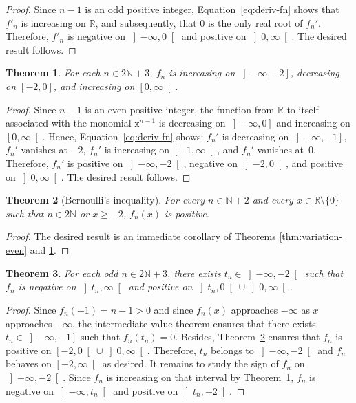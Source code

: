 \documentclass[12pt]{article}
\newcommand{\bR}{\mathbb{R}}
\newcommand{\bN}{\mathbb{N}}
\newcommand{\gtint}[1]{\left] #1, \infty \right[}
\newcommand{\geint}[1]{\left[ #1, \infty \right[}
\newcommand{\ltint}[1]{\left]- \infty, #1 \right[}
\newcommand{\leint}[1]{\left]- \infty, #1 \right]}
\newcommand{\ttx}{\mathtt{x}}
\newtheorem{theorem}{Theorem}
\begin{document}
 \begin{proof}
   Since $n - 1$ is an odd positive integer,
   Equation~\eqref{eq:deriv-fn} shows that
   $f'_n$ is increasing on $\bR$,
   and subsequently, that
   $0$ is the only real root of $f_n'$.
   Therefore,
   $f'_n$ is negative on $\ltint{0}$
   and 
   positive on $\gtint{0}$.
   The desired result follows.
 \end{proof}


 \begin{theorem} \label{thm:variation-odd}
   For each $n \in 2 \bN + 3$, $f_n$ is
   increasing on $\leint{- 2}$,
   decreasing on $[- 2, 0]$, and
   increasing on $\geint{0}$.
 \end{theorem}

 \begin{proof}
   Since $n - 1$ is an even positive integer,
   the function from $\bR$ to itself associated with the monomial $\ttx^{n - 1}$ is
   decreasing on $\leint{0}$ and
   increasing on $\geint{0}$.
   Hence, 
   Equation~\eqref{eq:deriv-fn} shows: 
   $f_n'$ is decreasing on $\leint{- 1}$,
   $f_n'$ vanishes at $- 2$,
   $f_n'$ is increasing on $\geint{- 1}$, and
   $f_n'$ vanishes at~$0$.
   Therefore, $f_n'$ is positive on $\ltint{- 2}$,
   negative on $\left]- 2, 0 \right[$, and
   positive on $\gtint{0}$.
   The desired result follows.
 \end{proof}

 \begin{theorem}[Bernoulli's inequality]
   \label{thm:Bernoulli}
   For every $n \in \bN + 2$ and every $x \in \bR \setminus \{ 0 \}$ such that $n \in 2 \bN$ or $x \ge - 2$,
   $f_n(x)$ is positive.
 \end{theorem}

 \begin{proof}
   The desired result is an immediate corollary of Theorems \ref{thm:variation-even} and \ref{thm:variation-odd}.
 \end{proof}
 
 
 \begin{theorem} \label{thm:tipping-point}
   For each odd  $n \in 2 \bN + 3$,
   there exists $t_n \in \ltint{- 2}$ such that $f_n$ is 
   negative on $\gtint{t_n}$
   and
   positive on $\left]t_n, 0 \right[ \cup \gtint{0}$.
 \end{theorem} 

 \begin{proof}
   Since $f_n(- 1) = n - 1 > 0$ and since $f_n(x)$ approaches $- \infty$ as $x$ approaches $- \infty$,
   the intermediate value theorem ensures that there exists $t_n \in \leint{- 1}$ such that $f_n(t_n) = 0$.
   Besides, Theorem~\ref{thm:Bernoulli} ensures that $f_n$ is positive on $\left[-2, 0 \right[ \cup \gtint{0}$.
   Therefore, $t_n$ belongs to $\ltint{- 2}$ and
   $f_n$ behaves on $\geint{- 2}$ as desired.
   It remains to study the sign of $f_n$ on $\ltint{-2}$.
   Since $f_n$ is increasing on that interval by Theorem~\ref{thm:variation-odd},
   $f_n$ is negative on $\ltint{t_n}$ and
   positive on $\left]t_n, - 2 \right[$.
 \end{proof}
\end{document}
